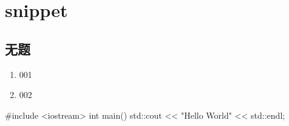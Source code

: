 \documentclass{../main.tex}{subfiles}
\begin{document}
\chapter{snippet}
\section{无题}
\begin{enumerate}[itemsep=0pt, parsep=0pt, topsep=0pt, partopsep=0pt]
  \item 001
  \item 002
\end{enumerate}

\begin{envCpp}[caption={xxx yyy}]
  #include <iostream>
  int main()
  {
    std::cout << "Hello World" << std::endl;
  }
\end{envCpp}


\end{document}
